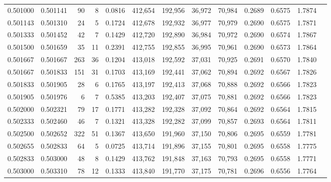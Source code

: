 \begin{tabular}{rrrrrrrrrrrrr}
0.501000 & 0.501141 &    90 &   8 &                                     0.0816 & 412,654 & 192,956 &  36,972 &  70,984 & 0.2689 & 0.6575 & 1.7874 \\
0.501143 & 0.501310 &    24 &   5 &                                     0.1724 & 412,678 & 192,932 &  36,977 &  70,979 & 0.2690 & 0.6575 & 1.7871 \\
0.501333 & 0.501452 &    42 &   7 &                                     0.1429 & 412,720 & 192,890 &  36,984 &  70,972 & 0.2690 & 0.6574 & 1.7867 \\
0.501500 & 0.501659 &    35 &  11 &                                     0.2391 & 412,755 & 192,855 &  36,995 &  70,961 & 0.2690 & 0.6573 & 1.7864 \\
0.501667 & 0.501667 &   263 &  36 &                                     0.1204 & 413,018 & 192,592 &  37,031 &  70,925 & 0.2691 & 0.6570 & 1.7840 \\
0.501667 & 0.501833 &   151 &  31 &                                     0.1703 & 413,169 & 192,441 &  37,062 &  70,894 & 0.2692 & 0.6567 & 1.7826 \\
0.501833 & 0.501905 &    28 &   6 &                                     0.1765 & 413,197 & 192,413 &  37,068 &  70,888 & 0.2692 & 0.6566 & 1.7823 \\
0.501905 & 0.501976 &     6 &   7 &                                     0.5385 & 413,203 & 192,407 &  37,075 &  70,881 & 0.2692 & 0.6566 & 1.7823 \\
0.502000 & 0.502321 &    79 &  17 &                                     0.1771 & 413,282 & 192,328 &  37,092 &  70,864 & 0.2692 & 0.6564 & 1.7815 \\
0.502333 & 0.502460 &    46 &   7 &                                     0.1321 & 413,328 & 192,282 &  37,099 &  70,857 & 0.2693 & 0.6564 & 1.7811 \\
0.502500 & 0.502652 &   322 &  51 &                                     0.1367 & 413,650 & 191,960 &  37,150 &  70,806 & 0.2695 & 0.6559 & 1.7781 \\
0.502655 & 0.502833 &    64 &   5 &                                     0.0725 & 413,714 & 191,896 &  37,155 &  70,801 & 0.2695 & 0.6558 & 1.7775 \\
0.502833 & 0.503000 &    48 &   8 &                                     0.1429 & 413,762 & 191,848 &  37,163 &  70,793 & 0.2695 & 0.6558 & 1.7771 \\
0.503000 & 0.503310 &    78 &  12 &                                     0.1333 & 413,840 & 191,770 &  37,175 &  70,781 & 0.2696 & 0.6556 & 1.7764 \\

\end{tabular}
